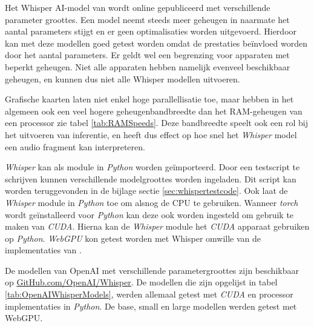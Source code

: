 Het Whisper AI-model van \textcite{OpenAI2023} wordt online gepubliceerd met verschillende parameter groottes. Een model neemt steeds meer geheugen in naarmate het aantal parameters stijgt en er geen optimalisaties worden uitgevoerd. Hierdoor kan met deze modellen goed getest worden omdat de prestaties beïnvloed worden door het aantal parameters. Er geldt wel een begrenzing voor apparaten met beperkt geheugen. Niet alle apparaten hebben namelijk evenveel beschikbaar geheugen, en kunnen dus niet alle Whisper modellen uitvoeren. 

\bigbreak{}

Grafische kaarten laten niet enkel hoge parallellisatie toe, maar hebben in het algemeen ook een veel hogere geheugenbandbreedte dan het RAM-geheugen van een processor zie tabel \ref{tab:RAMSpeeds}. Deze bandbreedte speelt ook een rol bij het uitvoeren van inferentie, en heeft dus effect op hoe snel het \textit{Whisper} model een audio fragment kan interpreteren.

\bigbreak{}

\textit{Whisper} kan als module in \textit{Python} worden geïmporteerd. Door een testscript te schrijven kunnen verschillende modelgroottes worden ingeladen. Dit script kan worden teruggevonden in de bijlage sectie \ref{sec:whispertestcode}. Ook laat de \textit{Whisper} module in \textit{Python} toe om alsnog de CPU te gebruiken. Wanneer \textit{torch} wordt geïnstalleerd voor \textit{Python} kan deze ook worden ingesteld om gebruik te maken van \textit{CUDA}. Hierna kan de \textit{Whisper} module het \textit{CUDA} apparaat gebruiken op \textit{Python}. \textit{WebGPU} kon getest worden met Whisper omwille van de implementaties van \textcite{Fleetwood2024, Fleetwood2023b}.

\bigbreak{}

De modellen van OpenAI met verschillende parametergroottes zijn beschikbaar op \href{https://github.com/openai/whisper}{GitHub.com/OpenAI/Whisper}. De modellen die zijn opgelijst in tabel \ref{tab:OpenAIWhisperModels}, werden allemaal getest met \textit{CUDA} en processor implementaties in \textit{Python}. De base, small en large modellen werden getest met WebGPU.

